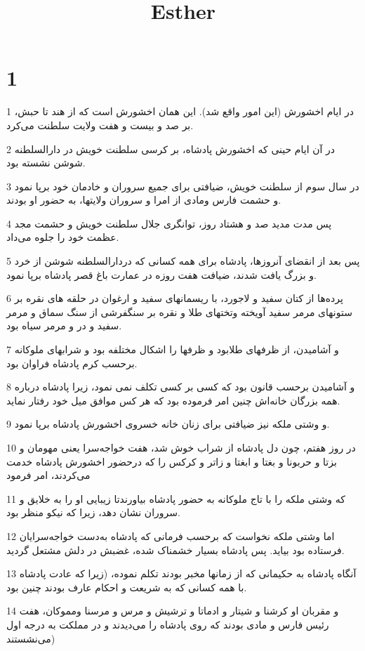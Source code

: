 

\title{Esther}

 
\chapter{1}

\par 1 در ایام اخشورش (این امور واقع شد). این همان اخشورش است که از هند تا حبش، بر صد و بیست و هفت ولایت سلطنت می‌کرد.
\par 2 در آن ایام حینی که اخشورش پادشاه، بر کرسی سلطنت خویش در دارالسلطنه شوشن نشسته بود.
\par 3 در سال سوم از سلطنت خویش، ضیافتی برای جمیع سروران و خادمان خود برپا نمود و حشمت فارس ومادی از امرا و سروران ولایتها، به حضور او بودند.
\par 4 پس مدت مدید صد و هشتاد روز، توانگری جلال سلطنت خویش و حشمت مجد عظمت خود را جلوه می‌داد.
\par 5 پس بعد از انقضای آنروزها، پادشاه برای همه کسانی که دردارالسلطنه شوشن از خرد و بزرگ یافت شدند، ضیافت هفت روزه در عمارت باغ قصر پادشاه برپا نمود.
\par 6 پرده‌ها از کتان سفید و لاجورد، با ریسمانهای سفید و ارغوان در حلقه های نقره بر ستونهای مرمر سفید آویخته وتختهای طلا و نقره بر سنگفرشی از سنگ سماق و مرمر سفید و در و مرمر سیاه بود.
\par 7 و آشامیدن، از ظرفهای طلابود و ظرفها را اشکال مختلفه بود و شرابهای ملوکانه برحسب کرم پادشاه فراوان بود.
\par 8 و آشامیدن برحسب قانون بود که کسی بر کسی تکلف نمی نمود، زیرا پادشاه درباره همه بزرگان خانه‌اش چنین امر فرموده بود که هر کس موافق میل خود رفتار نماید.
\par 9 و وشتی ملکه نیز ضیافتی برای زنان خانه خسروی اخشورش پادشاه برپا نمود.
\par 10 در روز هفتم، چون دل پادشاه از شراب خوش شد، هفت خواجه‌سرا یعنی مهومان و بزتا و حربونا و بغتا و ابغتا و زاتر و کرکس را که درحضور اخشورش پادشاه خدمت می‌کردند، امر فرمود
\par 11 که وشتی ملکه را با تاج ملوکانه به حضور پادشاه بیاورندتا زیبایی او را به خلایق و سروران نشان دهد، زیرا که نیکو منظر بود.
\par 12 اما وشتی ملکه نخواست که برحسب فرمانی که پادشاه به‌دست خواجه‌سرایان فرستاده بود بیاید. پس پادشاه بسیار خشمناک شده، غضبش در دلش مشتعل گردید.
\par 13 آنگاه پادشاه به حکیمانی که از زمانها مخبر بودند تکلم نموده، (زیرا که عادت پادشاه با همه کسانی که به شریعت و احکام عارف بودند چنین بود.
\par 14 و مقربان او کرشنا و شیتار و ادماتا و ترشیش و مرس و مرسنا ومموکان، هفت رئیس فارس و مادی بودند که روی پادشاه را می‌دیدند و در مملکت به درجه اول می‌نشستند)
